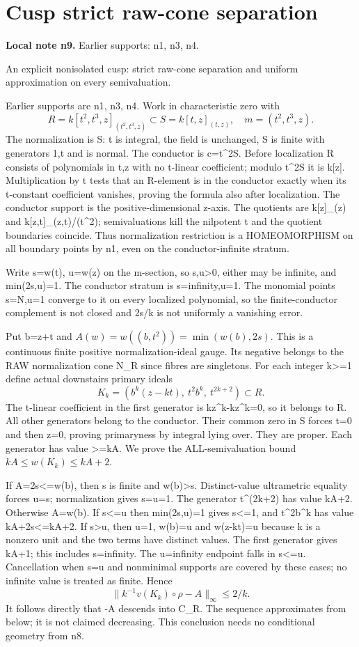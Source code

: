 \documentclass[11pt]{article}
\begin{document}
\section{Cusp strict raw-cone separation}
\label{sec:n9}
\noindent\textbf{Local note n9.} Earlier supports: n1, n3, n4.

An explicit nonisolated cusp: strict raw-cone separation and uniform approximation on every semivaluation.

Earlier supports are n1, n3, n4. Work in characteristic zero with
\[
 R=k[t^2,t^3,z]_{(t^2,t^3,z)}\subset S=k[t,z]_{(t,z)},\quad m=(t^2,t^3,z).
\]
The normalization is S: t is integral, the field is unchanged, S is finite with generators 1,t and is normal. The conductor is c=t\textasciicircum{}2S. Before localization R consists of polynomials in t,z with no t-linear coefficient; modulo t\textasciicircum{}2S it is k[z]. Multiplication by t tests that an R-element is in the conductor exactly when its t-constant coefficient vanishes, proving the formula also after localization. The conductor support is the positive-dimensional z-axis. The quotients are k[z]\_(z) and k[z,t]\_(z,t)/(t\textasciicircum{}2); semivaluations kill the nilpotent t and the quotient boundaries coincide. Thus normalization restriction is a HOMEOMORPHISM on all boundary points by n1, even on the conductor-infinite stratum.

Write s=w(t), u=w(z) on the m-section, so s,u>0, either may be infinite, and min(2s,u)=1. The conductor stratum is s=infinity,u=1. The monomial points s=N,u=1 converge to it on every localized polynomial, so the finite-conductor complement is not closed and 2s/k is not uniformly a vanishing error.

Put b=z+t and \(A(w)=w((b,t^2))=\min(w(b),2s)\). This is a continuous finite positive normalization-ideal gauge. Its negative belongs to the RAW normalization cone N\_R since fibres are singletons. For each integer k>=1 define actual downstairs primary ideals
\[
 K_k=(b^k(z-kt),\ t^2b^k,\ t^{2k+2})\subset R.
\]
The t-linear coefficient in the first generator is kz\textasciicircum{}k-kz\textasciicircum{}k=0, so it belongs to R. All other generators belong to the conductor. Their common zero in S forces t=0 and then z=0, proving primaryness by integral lying over. They are proper. Each generator has value >=kA. We prove the ALL-semivaluation bound \(kA\le w(K_k)\le kA+2\).

If A=2s<=w(b), then s is finite and w(b)>s. Distinct-value ultrametric equality forces u=s; normalization gives s=u=1. The generator t\textasciicircum{}(2k+2) has value kA+2. Otherwise A=w(b). If s<=u then min(2s,u)=1 gives s<=1, and t\textasciicircum{}2b\textasciicircum{}k has value kA+2s<=kA+2. If s>u, then u=1, w(b)=u and w(z-kt)=u because k is a nonzero unit and the two terms have distinct values. The first generator gives kA+1; this includes s=infinity. The u=infinity endpoint falls in s<=u. Cancellation when s=u and nonminimal supports are covered by these cases; no infinite value is treated as finite. Hence
\[
 \|k^{-1}v(K_k)\circ\rho-A\|_\infty\le2/k.
\]
It follows directly that -A descends into C\_R. The sequence approximates from below; it is not claimed decreasing. This conclusion needs no conditional geometry from n8.
\end{document}
